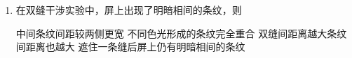 \begin{enumerate}
\begin{figure}[h!]
\end{figure}




\item 
{}
在双缝干涉实验中，屏上出现了明暗相间的条纹，则  

\fourchoices
{中间条纹间距较两侧更宽}
{不同色光形成的条纹完全重合}
{双缝间距离越大条纹间距离也越大}
{遮住一条缝后屏上仍有明暗相间的条纹}


	
	
	
\end{enumerate}


